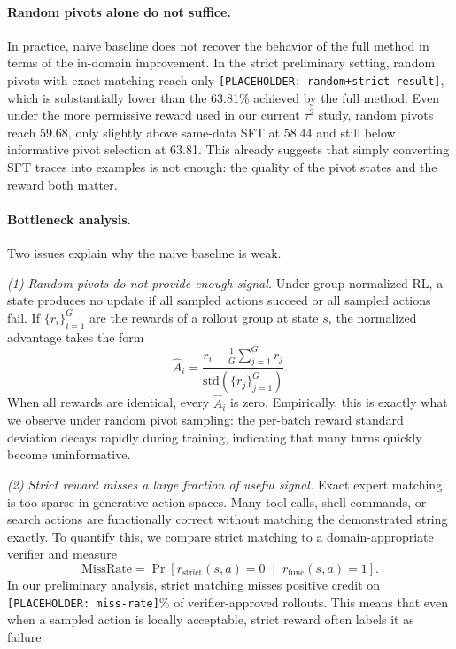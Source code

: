 \paragraph{Random pivots alone do not suffice.}
In practice, naive baseline does not recover the behavior of the full method in terms of the in-domain improvement. In the strict preliminary setting, random pivots with exact matching reach only \texttt{[PLACEHOLDER: random+strict result]}, which is substantially lower than the 63.81\% achieved by the full method. Even under the more permissive reward used in our current $\tau^2$ study, random pivots reach 59.68, only slightly above same-data SFT at 58.44 and still below informative pivot selection at 63.81. This already suggests that simply converting SFT traces into examples is not enough: the quality of the pivot states and the reward both matter.

\paragraph{Bottleneck analysis.}
Two issues explain why the naive baseline is weak.

\emph{(1) Random pivots do not provide enough signal.}
Under group-normalized RL, a state produces no update if all sampled actions succeed or all sampled actions fail. If $\{r_i\}_{i=1}^G$ are the rewards of a rollout group at state $s$, the normalized advantage takes the form
\[
\hat{A}_i=\frac{r_i-\frac{1}{G}\sum_{j=1}^G r_j}{\mathrm{std}(\{r_j\}_{j=1}^G)}.
\]
When all rewards are identical, every $\hat{A}_i$ is zero. Empirically, this is exactly what we observe under random pivot sampling: the per-batch reward standard deviation decays rapidly during training, indicating that many turns quickly become uninformative.

\emph{(2) Strict reward misses a large fraction of useful signal.}
Exact expert matching is too sparse in generative action spaces. Many tool calls, shell commands, or search actions are functionally correct without matching the demonstrated string exactly. To quantify this, we compare strict matching to a domain-appropriate verifier and measure
\[
\mathrm{MissRate}
=
\Pr\!\left[r_{\mathrm{strict}}(s,a)=0 \;\middle|\; r_{\mathrm{func}}(s,a)=1\right].
\]
In our preliminary analysis, strict matching misses positive credit on \texttt{[PLACEHOLDER: miss-rate]}\% of verifier-approved rollouts. This means that even when a sampled action is locally acceptable, strict reward often labels it as failure.

